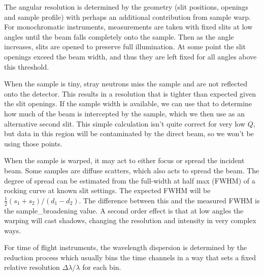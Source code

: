 \documentclass[letterpaper,10pt,english]{sphinxmanual}
\begin{document}
The angular resolution is determined by the geometry (slit positions,
openings and sample profile) with perhaps an additional contribution
from sample warp.  For monochromatic instruments, measurements are taken
with fixed slits at low angles until the beam falls completely onto the
sample.  Then as the angle increases, slits are opened to preserve full
illumination.  At some point the slit openings exceed the beam width,
and thus they are left fixed for all angles above this threshold.

When the sample is tiny, stray neutrons miss the sample and are not
reflected onto the detector.  This results in a resolution that is
tighter than expected given the slit openings.  If the sample width
is available, we can use that to determine how much of the beam is
intercepted by the sample, which we then use as an alternative second
slit.  This simple calculation isn't quite correct for very low $Q$, but
data in this region will be contaminated by the direct beam, so we
won't be using those points.

When the sample is warped, it may act to either focus or spread the
incident beam.  Some samples are diffuse scatters, which also acts
to spread the beam.  The degree of spread can be estimated from the
full-width at half max (FWHM) of a rocking curve at known slit settings.
The expected FWHM will be $\frac{1}{2}(s_1+s_2)/(d_1-d_2)$.  The difference
between this and the measured FWHM is the sample\_broadening value.
A second order effect is that at low angles the warping will cast
shadows, changing the resolution and intensity in very complex ways.

For time of flight instruments, the wavelength dispersion
is determined by the reduction process which usually bins the time
channels in a way that sets a fixed relative resolution
$\Delta \lambda / \lambda$ for each bin.
\end{document}
